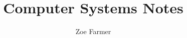 \newcommand{\python}[4]{\vspace{10pt}\inputminted[firstline=#2,
                                 lastline=#3,
                                 firstnumber=#2,
                                 gobble=#4,
                                 frame=single,
                                 label=#1,
                                 bgcolor=bg,
                                 linenos]{python}{#1} }
\newcommand{\js}[4]{\vspace{10pt}\inputminted[firstline=#2,
                                 lastline=#3,
                                 firstnumber=#2,
                                 gobble=#4,
                                 frame=single,
                                 label=#1,
                                 bgcolor=bg,
                                 linenos]{js}{#1} }
\pagestyle{fancy}                                                       %
\title{Computer Systems Notes}
\author{Zoe Farmer}

